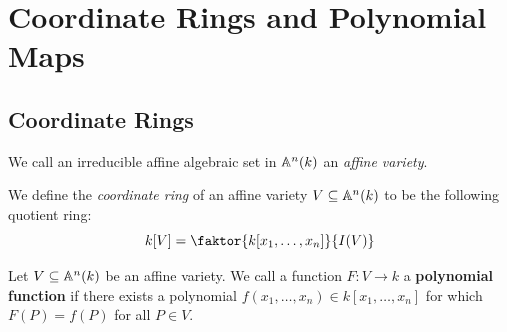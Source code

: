 \section{Coordinate Rings and Polynomial Maps}\label{section_2.1}

\subsection*{Coordinate Rings}

\begin{definition}
  We call an irreducible affine algebraic set in $\mathbb{A}^n(k)$ an
  \textit{affine variety}.
\end{definition}

\begin{definition}
  We define the \textit{coordinate ring} of an affine variety $V
  \subseteq \mathbb{A}^n(k)$ to be the following quotient ring:
  \begin{equation*}
    k[V]=\faktor{k[x_1, \dots, x_n]}{I(V)}
  \end{equation*}
\end{definition}

\begin{definition}
  Let $V \subseteq \mathbb{A}^n(k)$ be an affine variety. We call a function
  $F:V \xrightarrow{} k$ a \textbf{polynomial function} if there
  exists a polynomial $f(x_1, \dots, x_n) \in k[x_1, \dots, x_n]$
  for which $F(P)=f(P)$ for all $P \in V$.
\end{definition}

